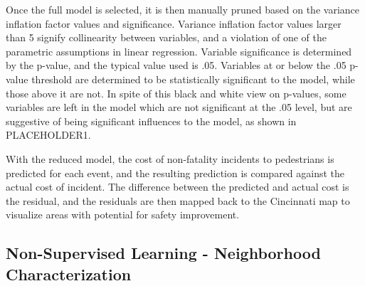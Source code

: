 \documentclass{llncs}
\begin{document}
Once the full model is selected, it is then manually pruned based on the variance inflation factor values and significance. Variance inflation factor values larger than 5 signify collinearity between variables, and a violation of one of the parametric assumptions in linear regression. Variable significance is determined by the p-value, and the typical value used is .05. Variables at or below the .05 p-value threshold are determined to be statistically significant to the model, while those above it are not. In spite of this black and white view on p-values, some variables are left in the model which are not significant at the .05 level, but are suggestive of being significant influences to the model, as shown in PLACEHOLDER1. 

With the reduced model, the cost of non-fatality incidents to pedestrians is predicted for each event, and the resulting prediction is compared against the actual cost of incident. The difference between the predicted and actual cost is the residual, and the residuals are then mapped back to the Cincinnati map to visualize areas with potential for safety improvement.

\subsection{Non-Supervised Learning - Neighborhood Characterization}
\end{document}
